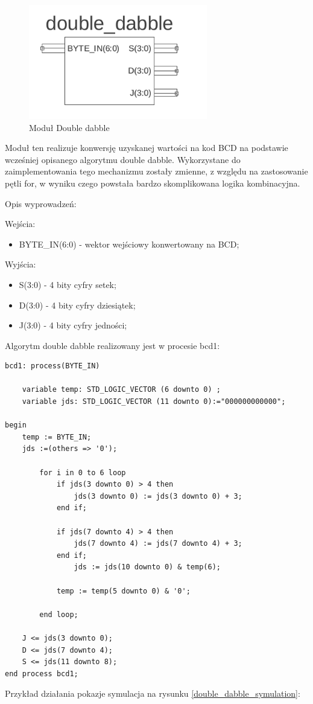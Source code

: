 \documentclass[a4paper]{article}
\begin{document}
\begin{figure}[H]
\begin{center}
\includegraphics[height=5cm]{graphics/double_dabble_sym.png}
\end{center}
\caption{Moduł Double dabble}
\label{double_dabble_sym}
\end{figure}

Moduł ten realizuje konwersję uzyskanej wartości na kod BCD na podstawie wcześniej opisanego algorytmu double dabble. Wykorzystane do zaimplementowania tego mechanizmu zostały zmienne, z względu na zastosowanie pętli for, w wyniku czego powstała bardzo skomplikowana logika kombinacyjna. 

Opis wyprowadzeń:

Wejścia:
\begin{itemize}
\item BYTE\_IN(6:0) - wektor wejściowy konwertowany na BCD;
\end{itemize}

Wyjścia:
\begin{itemize}
\item S(3:0) - 4 bity cyfry setek;
\item D(3:0) - 4 bity cyfry dziesiątek;
\item J(3:0) -  4 bity cyfry jedności;
\end{itemize}

Algorytm double dabble realizowany jest w procesie bcd1:

\lstset{language=VHDL}
\begin{lstlisting}[frame=single]
bcd1: process(BYTE_IN)

	variable temp: STD_LOGIC_VECTOR (6 downto 0) ;
	variable jds: STD_LOGIC_VECTOR (11 downto 0):="000000000000";

begin	
	temp := BYTE_IN; 
	jds :=(others => '0');

		for i in 0 to 6 loop
			if jds(3 downto 0) > 4 then 
				jds(3 downto 0) := jds(3 downto 0) + 3;
			end if;
     
			if jds(7 downto 4) > 4 then 
				jds(7 downto 4) := jds(7 downto 4) + 3;
			end if;
				jds := jds(10 downto 0) & temp(6);
			 
			temp := temp(5 downto 0) & '0';
			
		end loop;
		
	J <= jds(3 downto 0);
	D <= jds(7 downto 4);
	S <= jds(11 downto 8);
end process bcd1; 
\end{lstlisting}
Przykład działania pokazje symulacja na rysunku \ref{double_dabble_symulation}:
\end{document}
